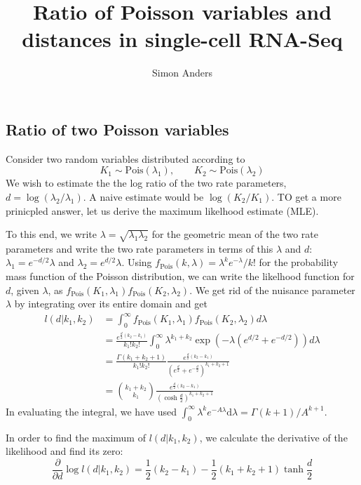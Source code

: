 \documentclass[fleqn]{article}
\title{Ratio of Poisson variables and\\ distances in single-cell RNA-Seq}
\author{Simon Anders}
\begin{document}
\maketitle

\subsection*{Ratio of two Poisson variables}

Consider two random variables distributed according to
\[ K_1 \sim \text{Pois}(\lambda_1), \qquad K_2 \sim \text{Pois}(\lambda_2) \]
We wish to estimate the the log ratio of the two rate parameters, $d = \log(\lambda_2/\lambda_1)$.
A naive estimate would be $\log (K_2/K_1)$. TO get a more prinicpled answer, let us derive the maximum likelhood estimate (MLE).

To this end, we write $\lambda=\sqrt{\lambda_1 \lambda_2}$ for the geometric mean of the two rate parameters and
write the two rate parameters in terms of this $\lambda$ and $d$: $\lambda_1=e^{-d/2}\lambda$ and $\lambda_2=e^{d/2}\lambda$.
Using $f_\text{Pois}(k,\lambda) = \lambda^k e^{-\lambda} / k!$ for the probability mass function of the Poisson distribution, we
can write the likelhood function for $d$, given $\lambda$, as $f_\text{Pois}(K_1,\lambda_1) f_\text{Pois}(K_2,\lambda_2)$. 
We get rid of the nuisance parameter $\lambda$ by integrating over its entire domain and get
\begin{align} l(d|k_1,k_2) &= \int_0^\infty f_\text{Pois}(K_1,\lambda_1) f_\text{Pois}(K_2,\lambda_2) d\lambda \nonumber \\
&= \frac{e^{\frac{d}{2}(k_2-k_1)}}{k_1! k_2!} \int_0^\infty \lambda^{k_1+k_2} \exp\left(  - \lambda (e^{d/2}+e^{-d/2}) \right)   d\lambda \nonumber  \\
&= \frac{\Gamma(k_1+k_2+1)}{k_1! k_2!} \frac{ \displaystyle e^{\frac{d}{2}(k_2-k_1)} }{\displaystyle  \left( e^\frac{d}{2}+e^{-\frac{d}{2}} \right)^{k_1+k_2+1} }
\nonumber\\
&= \binom{k_1+k_2}{k_1} \frac{ \displaystyle e^{\frac{d}{2}(k_2-k_1)} }{\left( \cosh\frac{d}{2}\right)^{k_1+k_2+1}}
\end{align}
In evaluating the integral, we have used $\int_0^\infty \lambda^{k}e^{-A\lambda}\text{d}\lambda = \Gamma(k+1)/A^{k+1}$. 

In order to find the maximum of $l(d|k_1,k_2)$, we calculate the derivative of the likelihood and find its zero:
\begin{equation} 
\frac{\partial}{\partial d} \log l(d|k_1,k_2) =  {\textstyle\frac{1}{2}}(k_2-k_1) - 
{\textstyle\frac{1}{2}}(k_1+k_2+1)\tanh{\textstyle\frac{d}{2}} \label{deriv_ll}
\end{equation}
\end{document}
